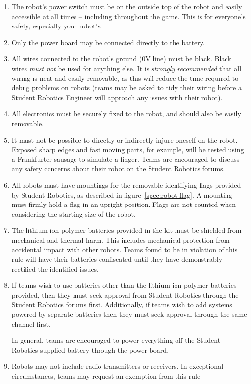 \begin{enumerate}
\item The robot's power switch must be on the outside top of the robot and easily accessible at all times -- including throughout the game.
      This is for everyone's safety, especially your robot's.

\item Only the power board may be connected directly to the battery.

\item All wires connected to the robot's ground (0V line) must be black.
      Black wires \emph{must not} be used for anything else.
      It is \emph{strongly recommended} that all wiring is neat and easily removable, as this will reduce the time required to debug problems on robots
       (teams may be asked to tidy their wiring before a Student Robotics Engineer will approach any issues with their robot).

\item All electronics must be securely fixed to the robot, and should also be easily removable.

\item It must not be possible to directly or indirectly injure oneself on the robot.
      Exposed sharp edges and fast moving parts, for example, will be tested using a Frankfurter sausage to simulate a finger.
      Teams are encouraged to discuss any safety concerns about their robot on the Student Robotics forums.

\item All robots must have mountings for the removable identifying flags
      provided by Student Robotics, as described in figure~\ref{spec:robot-flag}. A mounting
      must firmly hold a flag in an upright position. Flags are not counted
      when considering the starting size of the robot.

\item The lithium-ion polymer batteries provided in the kit must be shielded from mechanical and thermal harm.
      This includes mechanical protection from accidental impact with other robots.
      Teams found to be in violation of this rule will have their batteries confiscated until they have demonstrably rectified the identified issues.

\item If teams wish to use batteries other than the lithium-ion polymer batteries provided,
       then they must seek approval from Student Robotics through the Student Robotics forums first.
      Additionally, if teams wish to add systems powered by separate batteries then they must seek approval through the same channel first.

      In general, teams are encouraged to power everything off the Student Robotics supplied battery through the power board.

\item Robots may not include radio transmitters or receivers.
      In exceptional circumstances, teams may request an exemption from this rule.

\end{enumerate}
